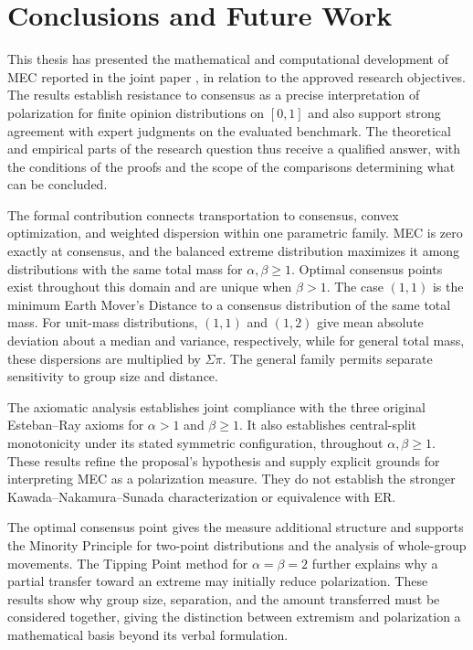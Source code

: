\documentclass{article}
\theoremstyle{plain}
\theoremstyle{remark}
\begin{document}
\section{Conclusions and Future Work}\label{sec:conclusion}\label{sec:contrib}


This thesis has presented the mathematical and computational development of MEC reported in the joint paper \citep{aranda2026mec}, in relation to the approved research objectives. The results establish resistance to consensus as a precise interpretation of polarization for finite opinion distributions on $[0,1]$ and also support strong agreement with expert judgments on the evaluated benchmark. The theoretical and empirical parts of the research question thus receive a qualified answer, with the conditions of the proofs and the scope of the comparisons determining what can be concluded.

The formal contribution connects transportation to consensus, convex optimization, and weighted dispersion within one parametric family. MEC is zero exactly at consensus, and the balanced extreme distribution maximizes it among distributions with the same total mass for $\alpha,\beta\geq1$. Optimal consensus points exist throughout this domain and are unique when $\beta>1$. The case $(1,1)$ is the minimum Earth Mover's Distance to a consensus distribution of the same total mass. For unit-mass distributions, $(1,1)$ and $(1,2)$ give mean absolute deviation about a median and variance, respectively, while for general total mass, these dispersions are multiplied by $\Sigma\pi$. The general family permits separate sensitivity to group size and distance.

The axiomatic analysis establishes joint compliance with the three original Esteban--Ray axioms for $\alpha>1$ and $\beta\geq1$. It also establishes central-split monotonicity under its stated symmetric configuration, throughout $\alpha,\beta\geq1$. These results refine the proposal's hypothesis and supply explicit grounds for interpreting MEC as a polarization measure. They do not establish the stronger Kawada--Nakamura--Sunada characterization or equivalence with ER.

The optimal consensus point gives the measure additional structure and supports the Minority Principle for two-point distributions and the analysis of whole-group movements. The Tipping Point method for $\alpha=\beta=2$ further explains why a partial transfer toward an extreme may initially reduce polarization. These results show why group size, separation, and the amount transferred must be considered together, giving the distinction between extremism and polarization a mathematical basis beyond its verbal formulation.
\end{document}
